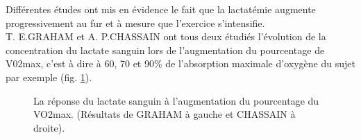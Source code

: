        Différentes études ont mis en évidence le fait que la lactatémie augmente progressivement au fur et à mesure que l'exercice s'intensifie.\\
       
       T. E.GRAHAM \cite{graham84} et A. P.CHASSAIN \cite{chassain86} ont tous deux étudiés l'évolution de la concentration du lactate sanguin lors de l'augmentation du pourcentage de V02max, c'est à dire à 60, 70 et 90\% de l'absorption maximale d'oxygène du sujet par exemple (fig. \ref{fig:lactate_vo2max}).\\
       
       \begin{figure}[H]
                \centering
                \hfill
                \caption{\label{fig:lactate_vo2max}
                La réponse du lactate sanguin à l'augmentation du pourcentage du VO2max. (Résultats de GRAHAM à gauche et CHASSAIN à droite).}
        \end{figure}
        
